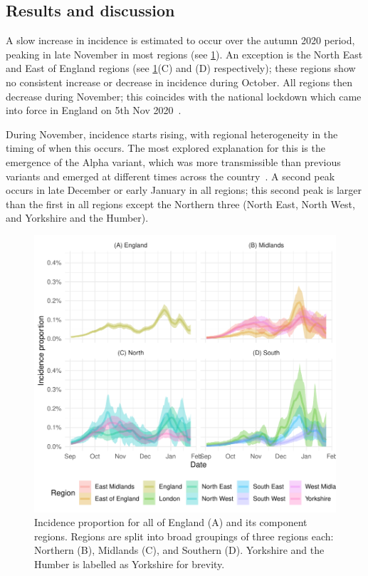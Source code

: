 \documentclass[thesis.tex]{subfiles}
\begin{document}
\subsection{Results and discussion} \label{backcalc:sec:results}

A slow increase in incidence is estimated to occur over the autumn 2020 period, peaking in late November in most regions (see \cref{transmission:fig:backcalc-regions}).
An exception is the North East and East of England regions (see \cref{transmission:fig:backcalc-regions}(C) and (D) respectively); these regions show no consistent increase or decrease in incidence during October.
All regions then decrease during November; this coincides with the national lockdown which came into force in England on 5th Nov 2020~\autocite{ifgTimeline}.

During November, incidence starts rising, with regional heterogeneity in the timing of when this occurs.
The most explored explanation for this is the emergence of the Alpha variant, which was more transmissible than previous variants and emerged at different times across the country~\autocite{walkerTracking,daviesEstimated,lythgoeLineage}.
A second peak occurs in late December or early January in all regions; this second peak is larger than the first in all regions except the Northern three (North East, North West, and Yorkshire and the Humber).
\begin{figure}
    \includegraphics{transmission/backcalc-regions}
    \caption[Incidence estimated using backcalculation by region]{%
        Incidence proportion for all of England (A) and its component regions.
        Regions are split into broad groupings of three regions each: Northern (B), Midlands (C), and Southern (D).
        Yorkshire and the Humber is labelled as Yorkshire for brevity.
    }
    \label{transmission:fig:backcalc-regions}
\end{figure}
\end{document}
